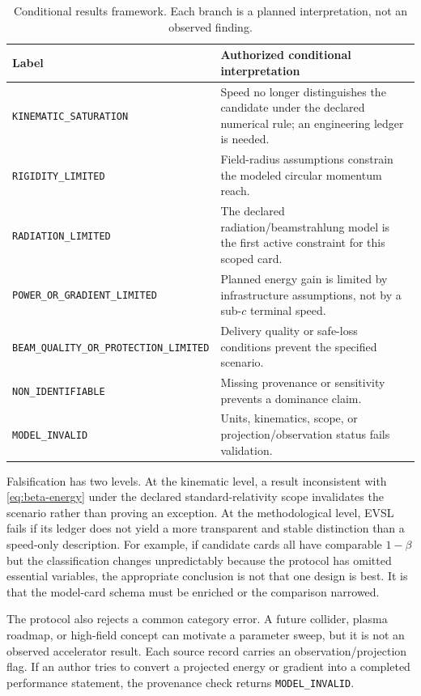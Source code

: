 \documentclass[conference]{../../../../Conference-LaTeX-template_10-17-19/IEEEtran}
\begin{document}
\begin{table}[!t]
\caption{Conditional results framework. Each branch is a planned interpretation, not an observed finding.}
\label{tab:branches}
\centering
\footnotesize
\begin{tabularx}{\columnwidth}{lY}
\toprule
Label & Authorized conditional interpretation \\
\midrule
\texttt{KINEMATIC\_SATURATION} & Speed no longer distinguishes the candidate under the declared numerical rule; an engineering ledger is needed. \\
\texttt{RIGIDITY\_LIMITED} & Field-radius assumptions constrain the modeled circular momentum reach. \\
\texttt{RADIATION\_LIMITED} & The declared radiation/beamstrahlung model is the first active constraint for this scoped card. \\
\texttt{POWER\_OR\_GRADIENT\_LIMITED} & Planned energy gain is limited by infrastructure assumptions, not by a sub-$c$ terminal speed. \\
\texttt{BEAM\_QUALITY\_OR\_PROTECTION\_LIMITED} & Delivery quality or safe-loss conditions prevent the specified scenario. \\
\texttt{NON\_IDENTIFIABLE} & Missing provenance or sensitivity prevents a dominance claim. \\
\texttt{MODEL\_INVALID} & Units, kinematics, scope, or projection/observation status fails validation. \\
\bottomrule
\end{tabularx}
\end{table}

Falsification has two levels. At the kinematic level, a result inconsistent with \eqref{eq:beta-energy} under the declared standard-relativity scope invalidates the scenario rather than proving an exception. At the methodological level, EVSL fails if its ledger does not yield a more transparent and stable distinction than a speed-only description. For example, if candidate cards all have comparable $1-\beta$ but the classification changes unpredictably because the protocol has omitted essential variables, the appropriate conclusion is not that one design is best. It is that the model-card schema must be enriched or the comparison narrowed.

The protocol also rejects a common category error. A future collider, plasma roadmap, or high-field concept can motivate a parameter sweep, but it is not an observed accelerator result. Each source record carries an observation/projection flag. If an author tries to convert a projected energy or gradient into a completed performance statement, the provenance check returns \texttt{MODEL\_INVALID}.
\end{document}
